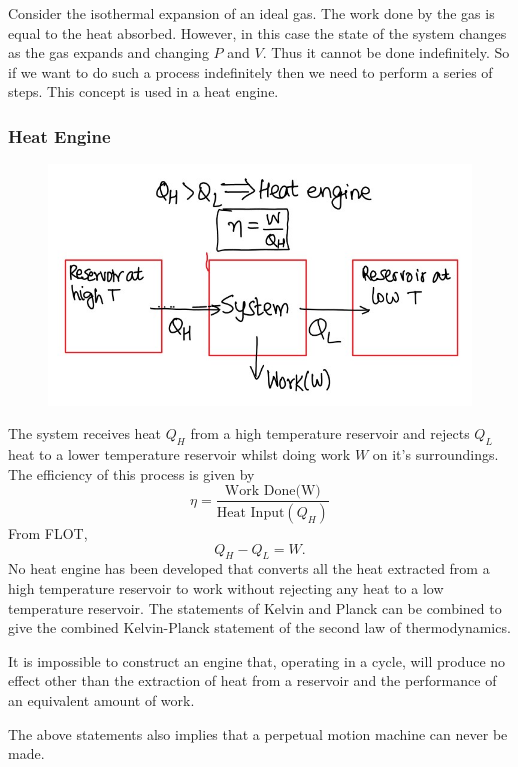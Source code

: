 \documentclass[12pt]{article}
\begin{document}
Consider the isothermal expansion of an ideal gas. The work done by the gas is equal to the heat absorbed. However, in this case the state of the system changes as the gas expands and changing $P$ and $V$. Thus it cannot be done indefinitely. So if we want to do such a process indefinitely then we need to perform a series of steps. This concept is used in a heat engine. 

\subsubsection{Heat Engine}
\begin{figure}
	\includegraphics{heatengine.jpg}
	\centering
\end{figure}
The system receives heat $Q_H$ from a high temperature reservoir and rejects $Q_L$ heat to a lower temperature reservoir whilst doing work $W$ on it's surroundings. The efficiency of this process is given by
\begin{equation}
	\eta=\dfrac{\text{Work Done(W)}}{\text{Heat Input}(Q_H)}
\end{equation}
From FLOT, $$Q_H-Q_L=W.$$
No heat engine has been developed that converts all the heat extracted from a high temperature reservoir to work without rejecting any heat to a low temperature reservoir. 
The statements of Kelvin and Planck can be combined to give the combined Kelvin-Planck statement of the second law of thermodynamics.
\begin{tcolorbox}[title=Kelvin-Planck Statement of the Second Law]
	It is impossible to construct an engine that, operating in a cycle, will produce no effect other than the extraction of heat from a reservoir and the performance of an equivalent amount of work.
\end{tcolorbox}
The above statements also implies that a perpetual motion machine can never be made.
\end{document}
